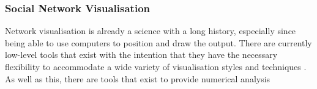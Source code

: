 \documentclass[12pt,a4paper]{article}
\begin{document}
\subsubsection{Social Network Visualisation}
Network visualisation is already a science with a long history, especially since being able to use computers to position and draw the output. There are currently low-level tools that exist with the intention that they have the necessary flexibility to accommodate a wide variety of visualisation styles and techniques \cite{heer2005prefuse}. As well as this, there are tools that exist to provide numerical analysis
\end{document}

